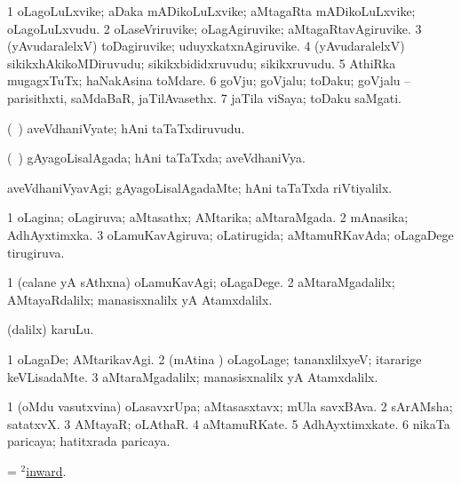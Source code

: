 \bentry
{}
\gl{\nA}
\bmng
\bnum
\num{1} oLagoLuLxvike; aDaka mADikoLuLxvike; aMtagaRta mADikoLuLxvike; oLagoLuLxvudu. 
\num{2} oLaseVriruvike; oLagAgiruvike; aMtagaRtavAgiruvike. 
\num{3} (yAvudaralelxV) toDagiruvike; uduyxkatxnAgiruvike. 
\num{4} (yAvudaralelxV) sikikxhAkikoMDiruvudu; sikikxbididxruvudu; sikikxruvudu. 
\num{5} AthiRka mugagxTuTx; haNakAsina toMdare. 
\num{6} goVju; goVjalu; toDaku; goVjalu -- parisithxti, saMdaBaR, jaTilAvasethx. 
\num{7} jaTila viSaya; toDaku saMgati. 
\enum
\emng
\eentry

\bentry
{}
\gl{\nA}
\bmng
(\kanmu\ \rUpa) aveVdhaniVyate; hAni taTaTxdiruvudu. 
\emng
\eentry

\bentry
{}
\gl{\gu}
\bmng
(\kanmu\ \rUpa) gAyagoLisalAgada; hAni taTaTxda; aveVdhaniVya. 
\emng
\eentry

\bentry
{}
\gl{\kirxvi}
\bmng
aveVdhaniVyavAgi; gAyagoLisalAgadaMte; hAni taTaTxda riVtiyalilx. 
\emng
\eentry

\bentry
{}
\gl{\gu}
\bmng
\bnum
\num{1} oLagina; oLagiruva; aMtasathx; AMtarika; aMtaraMgada. 
\num{2} mAnasika; AdhAyxtimxka. 
\num{3} oLamuKavAgiruva; oLatirugida; aMtamuRKavAda; oLagaDege tirugiruva. 
\enum
\emng
\eentry

\bentry
{}
\gl{\kirxvi}
\bmng
\bnum
\num{1} (calane yA sAthxna) oLamuKavAgi; oLagaDege. 
\num{2} aMtaraMgadalilx; AMtayaRdalilx; manasisxnalilx yA Atamxdalilx. 
\enum
\emng
\eentry

\bentry
{}
\gl{\nA}
\bmng
(\bava dalilx) karuLu. 
\emng
\eentry

\bentry
{}
\gl{\kirxvi}
\bmng
\bnum
\num{1} oLagaDe; AMtarikavAgi. 
\num{2} (mAtina \vi) oLagoLage; tananxlilxyeV; itararige keVLisadaMte. 
\num{3} aMtaraMgadalilx; manasisxnalilx yA Atamxdalilx. 
\enum
\emng
\eentry

\bentry
{}
\gl{\nA}
\bmng
\bnum
\num{1} (oMdu vasutxvina) oLasavxrUpa; aMtasasxtavx; mUla savxBAva. 
\num{2} sArAMsha; satatxvX. 
\num{3} AMtayaR; oLAthaR. 
\num{4} aMtamuRKate. 
\num{5} AdhAyxtimxkate. 
\num{6} nikaTa paricaya; hatitxrada paricaya. 
\enum
\emng
\eentry

\bentry
{}
\gl{\kirxvi}
\bmng
= \hyperlink{inward(2)}{$^2$inward}. 
\emng
\eentry

